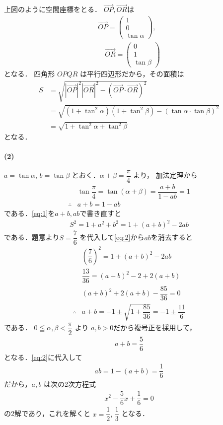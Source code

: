 \documentclass[../../main.tex]{subfiles}
\begin{document}
上図のように空間座標をとる．
$\overrightarrow{OP},\overrightarrow{OR}$は
\begin{align}
  \overrightarrow{OP} =
  \begin{pmatrix} 1 \\ 0 \\ \tan\alpha
  \end{pmatrix}, \\
  \quad \overrightarrow{OR} =
  \begin{pmatrix} 0 \\ 1 \\ \tan\beta
  \end{pmatrix}
\end{align}
となる．
四角形 $OPQR$ は平行四辺形だから，その面積は
\begin{align}
  S
  &= \sqrt{|\overrightarrow{OP}|^2 |\overrightarrow{OR}|^2 - (\overrightarrow{OP} \cdot \overrightarrow{OR})^2} \\
  &= \sqrt{(1 + \tan^2\alpha)(1 + \tan^2\beta) - (\tan\alpha \cdot \tan\beta)^2} \\
  &= \sqrt{1 + \tan^2\alpha + \tan^2\beta} \label{eq:1}
\end{align}
となる．

\paragraph{(2)}

$a = \tan\alpha, \, b = \tan\beta$ とおく．$\alpha + \beta = \dfrac{\pi}{4}$ より，
加法定理から
\begin{align}
  &\tan\dfrac{\pi}{4} = \tan(\alpha + \beta) = \dfrac{a + b}{1 - ab} = 1 \\
  \therefore
  & a + b = 1 - ab \label{eq:2}
\end{align}
である．\cref{eq:1}を$a+b, ab$で書き直すと
\begin{align}
  S^2 = 1 + a^2 + b^2 = 1 + (a+b)^2 - 2ab \label{eq:3}
\end{align}
である．題意より$S = \dfrac{7}{6}$ を代入して\cref{eq:2}から$ab$を消去すると
\begin{align}
  & \left(\dfrac{7}{6}\right)^2 = 1 + (a+b)^2 - 2ab \\
  & \dfrac{13}{36} = (a+b)^2 - 2 + 2(a+b) \\
  & (a+b)^2 + 2(a+b) - \dfrac{85}{36} = 0 \\
  \therefore
  & a+b = -1 \pm \sqrt{1 + \dfrac{85}{36}} = -1 \pm \dfrac{11}{6}
\end{align}
である．
$0 \leqq \alpha, \beta < \dfrac{\pi}{2}$ より $a,b>0$だから複号正を採用して，
\begin{align}
  a+b = \dfrac{5}{6}　\label{eq:4}
\end{align}
となる．\cref{eq:2}に代入して
\begin{align}
  ab = 1 - (a+b) = \dfrac{1}{6}
\end{align}
だから，$a, b$ は次の2次方程式
\begin{align}
  x^2 - \dfrac{5}{6}x + \dfrac{1}{6} = 0
\end{align}
の2解であり，これを解くと $x = \dfrac{1}{2}, \, \dfrac{1}{3}$ となる．
\end{document}
